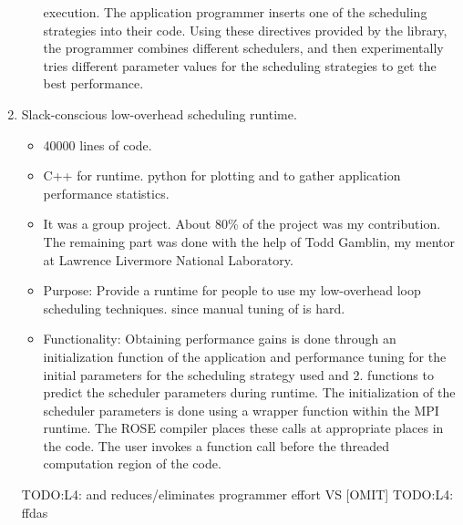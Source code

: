 \begin{frame}
\begin{enumerate}
\begin{itemize}
  execution. The application programmer inserts one of 
  the scheduling strategies into their code. Using these directives
  provided by the library, the programmer combines different
  schedulers, and then experimentally tries different parameter values
  for the scheduling strategies to get the best performance. 
\end{itemize} 
\item \tiny Slack-conscious low-overhead scheduling runtime. 
\begin{itemize} 
\tiny \item \tiny 40000 lines of code. 
\item \tiny C++ for runtime. python for plotting and to gather application performance statistics.
\item \tiny It was a group project. About 80\% of the project was my
  contribution. The remaining part was done with the help of Todd Gamblin,
  my mentor at Lawrence Livermore National Laboratory. 
\item \tiny Purpose: Provide a runtime for people to use my 
  low-overhead loop scheduling techniques. since manual tuning of is
  hard.
\item \tiny Functionality: Obtaining performance gains is done through
  an initialization function of the application and performance 
  tuning for the initial parameters for the scheduling strategy used
  and 2. functions to predict the scheduler parameters during
  runtime.  The initialization of the scheduler parameters is done
  using a wrapper function within the MPI runtime. The ROSE compiler
  places these calls at appropriate places in
  the code. The user invokes a function call before the threaded 
  computation region of the code.
\end{itemize} 

TODO:L4: and reduces/eliminates programmer effort VS [OMIT] 
TODO:L4: ffdas
\end{enumerate}
\end{frame}

